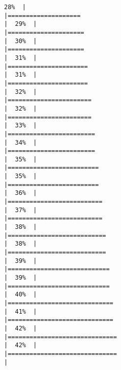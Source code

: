 \documentclass[
]{article}
\begin{document}
\begin{verbatim}
28%  |                                                                              |====================                                                  |  29%  |                                                                              |=====================                                                 |  30%  |                                                                              |=====================                                                 |  31%  |                                                                              |======================                                                |  31%  |                                                                              |======================                                                |  32%  |                                                                              |=======================                                               |  32%  |                                                                              |=======================                                               |  33%  |                                                                              |========================                                              |  34%  |                                                                              |========================                                              |  35%  |                                                                              |=========================                                             |  35%  |                                                                              |=========================                                             |  36%  |                                                                              |==========================                                            |  37%  |                                                                              |==========================                                            |  38%  |                                                                              |===========================                                           |  38%  |                                                                              |===========================                                           |  39%  |                                                                              |============================                                          |  39%  |                                                                              |============================                                          |  40%  |                                                                              |=============================                                         |  41%  |                                                                              |=============================                                         |  42%  |                                                                              |==============================                                        |  42%  |                                                                              |==============================                                        |  
\end{verbatim}
\end{document}
